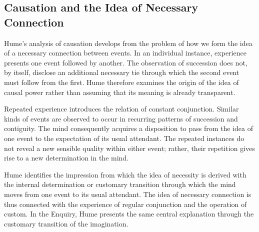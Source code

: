 
\subsection{Causation and the Idea of Necessary Connection}
\label{subsec:ch08-hume-causation}

\label{para:VS.B01.P01.C08.S09.SS05.P001}

Hume's analysis of causation develops from the problem
of how we form the idea of a necessary connection
between events. In an individual instance, experience
presents one event followed by another. The observation
of succession does not, by itself, disclose an
additional necessary tie through which the second
event must follow from the first. Hume therefore
examines the origin of the idea of causal power
rather than assuming that its meaning is already
transparent.
\cite[1.3.14.1--15, SBN 155--163]{HumeTreatise}

\label{para:VS.B01.P01.C08.S09.SS05.P002}

Repeated experience introduces the relation of
constant conjunction. Similar kinds of events are
observed to occur in recurring patterns of succession
and contiguity. The mind consequently acquires a
disposition to pass from the idea of one event to
the expectation of its usual attendant. The repeated
instances do not reveal a new sensible quality
within either event; rather, their repetition gives
rise to a new determination in the mind.
\cite[1.3.6.3--4, SBN 87--89; 1.3.14.16--23, SBN 163--166]{HumeTreatise}

\label{para:VS.B01.P01.C08.S09.SS05.P003}

Hume identifies the impression from which the idea
of necessity is derived with the internal determination
or customary transition through which the mind moves
from one event to its usual attendant. The idea of
necessary connection is thus connected with the
experience of regular conjunction and the operation
of custom. In the Enquiry, Hume presents the same
central explanation through the customary transition
of the imagination.
\cite[1.3.14.20--31, SBN 164--170]{HumeTreatise}
\cite[7.26--30, SBN 73--78]{HumeEnquiry}


